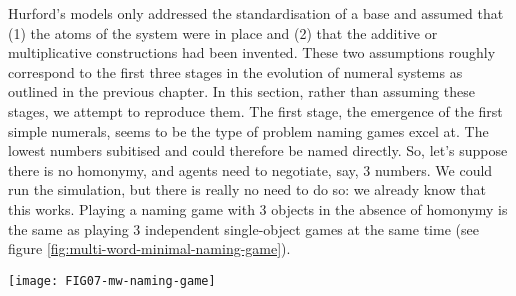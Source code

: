 \documentclass{../src/bcthesispart}
\begin{document}
Hurford’s models only addressed the standardisation of a base and assumed that (1) the atoms of the system were in place and (2) that the additive or multiplicative constructions had been invented.
These two assumptions roughly correspond to the first three stages in the evolution of numeral systems as outlined in the previous chapter.
In this section, rather than assuming these stages, we attempt to reproduce them.
The first stage, the emergence of the first simple numerals, seems to be the type of problem naming games excel at.
The lowest numbers subitised and could therefore be named directly.
So, let’s suppose there is no homonymy, and agents need to negotiate, say, 3 numbers.
We could run the simulation, but there is really no need to do so: we already know that this works.
Playing a naming game with 3 objects in the absence of homonymy is the same as playing 3 independent single-object games at the same time (see figure \ref{fig:multi-word-minimal-naming-game}).



\begin{SCfigure}
	\texttt{[image: FIG07-mw-naming-game]}

	\caption{%
	A naming game with three objects is just the sum of three independent single-word \textsc{ng}’s when there is no homonymy.
	Dashed lines show the statistics per object; solid lines for the ‘total’ game: the sum of the dashed lines.
	\label{fig:multi-word-minimal-naming-game}}
\end{SCfigure}
\end{document}
